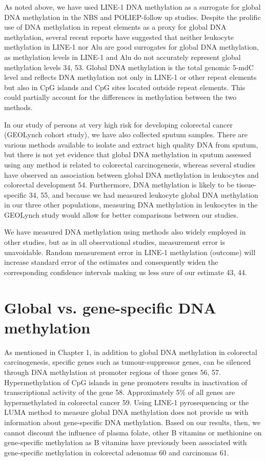 \noindent As noted above, we have used LINE-1 DNA methylation as a surrogate for global DNA methylation in the NBS and POLIEP-follow up studies. Despite the prolific use of DNA methylation in repeat elements as a proxy for global DNA methylation, several recent reports have suggested that neither leukocyte methylation in LINE-1 nor Alu are good surrogates for global DNA methylation, as methylation levels in LINE-1 and Alu do not accurately represent global methylation levels 34, 53. Global DNA methylation is the total genomic 5-mdC level and reflects DNA methylation not only in LINE-1 or other repeat elements but also in CpG islands and CpG sites located outside repeat elements. This could partially account for the differences in methylation between the two methods. 
 
\noindent In our study of persons at very high risk for developing colorectal cancer (GEOLynch cohort study), we have also collected sputum samples. There are various methods available to isolate and extract high quality DNA from sputum, but there is not yet evidence that global DNA methylation in sputum assessed using any method is related to colorectal carcinogenesis, whereas several studies have observed an association between global DNA methylation in leukocytes and colorectal development 54. Furthermore, DNA methylation is likely to be tissue-specific 34, 55, and because we had measured leukocyte global DNA methylation in our three other populations, measuring DNA methylation in leukocytes in the GEOLynch study would allow for better comparisons between our studies. 
 
\noindent We have measured DNA methylation using methods also widely employed in other studies, but as in all observational studies, measurement error is unavoidable. Random measurement error in LINE-1 methylation (outcome) will increase standard error of the estimates and consequently widen the corresponding confidence intervals making us less sure of our estimate 43, 44. 
 
\section[]{Global vs. gene-specific DNA methylation} %
As mentioned in Chapter 1, in addition to global DNA methylation in colorectal carcinogenesis, specific genes such as tumour-suppressor genes, can be silenced through DNA methylation at promoter regions of those genes 56, 57. Hypermethylation of CpG islands in gene promoters results in inactivation of transcriptional activity of the gene 58. Approximately 5\% of all genes are hypermethylated in colorectal cancer 59. Using LINE-1 pyrosequencing or the LUMA method to measure global DNA methylation does not provide us with information about gene-specific DNA methylation. Based on our results, then, we cannot discount the influence of plasma folate, other B vitamins or methionine on gene-specific methylation as B vitamins have previously been associated with gene-specific methylation in colorectal adenomas 60 and carcinomas 61. 
 
